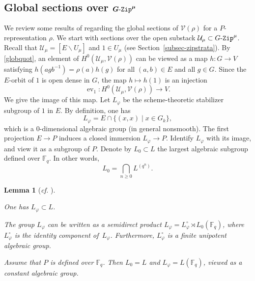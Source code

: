 \documentclass[10pt,a4paper]{article}
\numberwithin{equation}{section}
\newtheorem{lemma}[theorem]{Lemma}
\theoremstyle{definition}
\theoremstyle{remark}
\newcommand{\GZip}{\mathop{\text{$G$-{\tt Zip}}}\nolimits}
\newcommand{\Ucal}{{\mathcal U}}
\newcommand{\Vcal}{{\mathcal V}}
\newcommand{\FF}{\mathbb{F}}
\DeclareMathOperator{\ev}{ev}
\newcommand{\lra}{\longrightarrow}
\begin{document}
\subsection{Global sections over $\boldsymbol{\GZip^\mu}$} \label{subsec-global-sections}
We review some results of \cite{Imai-Koskivirta-vector-bundles} regarding the global sections of $\Vcal(\rho)$ for a $P$-representation $\rho$. We start with sections over the open substack $\Ucal_\mu\subset \GZip^\mu$. Recall that $\Ucal_\mu=[E\backslash U_\mu]$ and $1\in U_\mu$ (see Section~\ref{subsec-zipstrata}). By \eqref{globquot}, an element of $H^0(\Ucal_\mu,\Vcal(\rho))$ can be viewed as a map $h\colon G\to V$ satisfying $h(agb^{-1})=\rho(a)h(g)$ for all $(a,b)\in E$ and all $g\in G$. Since the $E$-orbit of $1$ is open dense in $G$, the map $h\mapsto h(1)$ is an injection
\begin{equation}\label{injection-ev1}
\ev_1 \colon H^0\left(\Ucal_\mu,\Vcal(\rho)\right)\lra V.
\end{equation}
We give the image of this map. Let $L_\varphi$ be the scheme-theoretic stabilizer subgroup of $1$ in $E$. By definition, one has
\begin{equation}\label{Lphi-equ}
L_{\varphi}=E\cap \{(x,x) \mid x\in G_k \}, 
\end{equation}
which is a $0$-dimensional algebraic group (in general nonsmooth). The first projection $E\to P$ induces a closed immersion $L_{\varphi}\to P$. Identify $L_\varphi$ with its image, and view it as a subgroup of $P$. Denote by $L_0\subset L$ the largest algebraic subgroup defined over $\FF_q$. 
In other words,
\begin{equation}\label{eqL0}
    L_0=\bigcap_{n\geq 0}L^{(q^n)}.
\end{equation}

\begin{lemma}[\textit{cf.} {\cite[Lemma 3.2.1]{Koskivirta-Wedhorn-Hasse}}]\label{lemLphi} \leavevmode
\begin{assertionlist}
\item \label{lemLphi-item1} One has $L_{\varphi}\subset L$.
\item \label{lemLphi-item2}  The group $L_{\varphi}$ can be written as a semidirect product $L_{\varphi}=L_{\varphi}^\circ\rtimes L_0(\FF_q)$, where $L_{\varphi}^\circ$ is the identity component of\, $L_{\varphi}$. Furthermore, $L_{\varphi}^\circ$ is a finite unipotent algebraic group.
\item \label{lemLphi-item3}  Assume that $P$ is defined over $\FF_q$. Then $L_0=L$ and $L_{\varphi}=L(\FF_q)$, viewed as a constant algebraic group.
\end{assertionlist}
\end{lemma}
\end{document}
